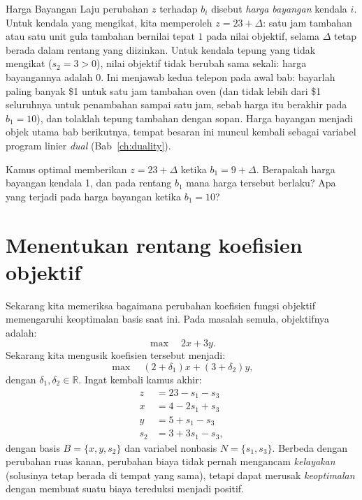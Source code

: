 \begin{remark}{Harga Bayangan}{}
Laju perubahan $z$ terhadap $b_i$ disebut \emph{harga bayangan} kendala $i$. Untuk kendala yang mengikat, kita memperoleh $z = 23 + \Delta$: satu jam tambahan atau satu unit gula tambahan bernilai tepat $1$ pada nilai objektif, selama $\Delta$ tetap berada dalam rentang yang diizinkan. Untuk kendala tepung yang tidak mengikat ($s_2 = 3 > 0$), nilai objektif tidak berubah sama sekali: harga bayangannya adalah $0$. Ini menjawab kedua telepon pada awal bab: bayarlah paling banyak \$1 untuk satu jam tambahan oven (dan tidak lebih dari \$1 seluruhnya untuk penambahan sampai satu jam, sebab harga itu berakhir pada $b_1 = 10$), dan tolaklah tepung tambahan dengan sopan. Harga bayangan menjadi objek utama bab berikutnya, tempat besaran ini muncul kembali sebagai variabel program linier \emph{dual} (Bab~\ref{ch:duality}).
\end{remark}

\begin{learningcheckpoint}[label={lc:shadow-price-b1}]
Kamus optimal memberikan \( z = 23 + \Delta \) ketika \( b_1 = 9 + \Delta \). Berapakah harga bayangan kendala 1, dan pada rentang \( b_1 \) mana harga tersebut berlaku? Apa yang terjadi pada harga bayangan ketika \( b_1 = 10 \)?
\end{learningcheckpoint}

\section{Menentukan rentang koefisien objektif}
\label{sec:sensitivity-cost}

Sekarang kita memeriksa bagaimana perubahan koefisien fungsi objektif memengaruhi keoptimalan basis saat ini. Pada masalah semula, objektifnya adalah:
\[
\max \quad 2x + 3y.
\]
Sekarang kita mengusik koefisien tersebut menjadi:
\[
\max \quad (2 + \delta_1)x + (3 + \delta_2)y,
\]
dengan \( \delta_1, \delta_2 \in \mathbb{R} \). Ingat kembali kamus akhir:
\[
\begin{aligned}
z &= 23 - s_1 - s_3 \\
x &= 4 - 2s_1 + s_3 \\
y &= 5 + s_1 - s_3 \\
s_2 &= 3 + 3s_1 - s_3,
\end{aligned}
\]
dengan basis \( B = \{x, y, s_2\} \) dan variabel nonbasis \( N = \{s_1, s_3\} \). Berbeda dengan perubahan ruas kanan, perubahan biaya tidak pernah mengancam \emph{kelayakan} (solusinya tetap berada di tempat yang sama), tetapi dapat merusak \emph{keoptimalan} dengan membuat suatu biaya tereduksi menjadi positif.

